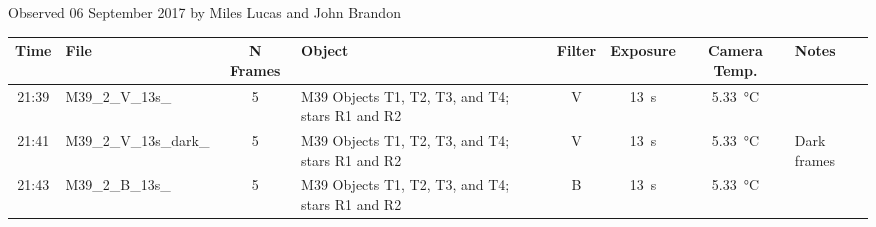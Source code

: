 \caption{Observed 06 September 2017 by Miles Lucas and John Brandon}
\begin{tabular}{clclcccl}
	\hline
	Time  & File                   & N Frames & Object                                     & Filter &     Exposure     &       Camera Temp.        & Notes       \\ \hline\hline
	21:39 & M39\_2\_V\_13s\_       &    5     & M39 Objects T1, T2, T3, and T4; stars R1 and R2 &   V    & \SI{13}{\second} & \SI{5.33}{\degreeCelsius} &             \\
	21:41 & M39\_2\_V\_13s\_dark\_ &    5     & M39 Objects T1, T2, T3, and T4; stars R1 and R2 &   V    & \SI{13}{\second} & \SI{5.33}{\degreeCelsius} & Dark frames \\
	21:43 & M39\_2\_B\_13s\_       &    5     & M39 Objects T1, T2, T3, and T4; stars R1 and R2 &   B    & \SI{13}{\second} & \SI{5.33}{\degreeCelsius} &             \\ \hline
\end{tabular}
